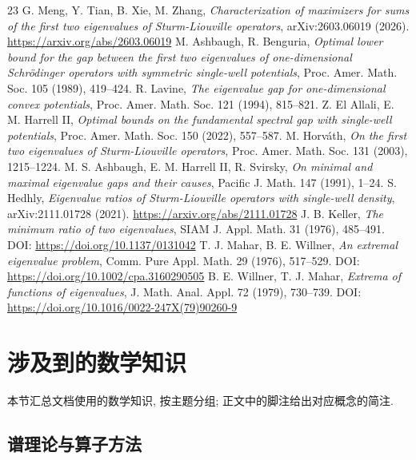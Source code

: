 \documentclass[UTF8]{ctexart}
\begin{document}
\begin{thebibliography}{23}
 G. Meng, Y. Tian, B. Xie, M. Zhang, \emph{Characterization of
	maximizers for sums of the first two eigenvalues of Sturm-Liouville operators},
	arXiv:2603.06019 (2026). \url{https://arxiv.org/abs/2603.06019}
 M. Ashbaugh, R. Benguria, \emph{Optimal lower bound for the gap
	between the first two eigenvalues of one-dimensional Schr\"odinger operators
	with symmetric single-well potentials}, Proc. Amer. Math. Soc. 105 (1989),
	419--424.
 R. Lavine, \emph{The eigenvalue gap for one-dimensional convex
	potentials}, Proc. Amer. Math. Soc. 121 (1994), 815--821.
 Z. El Allali, E. M. Harrell II, \emph{Optimal bounds on the
	fundamental spectral gap with single-well potentials}, Proc. Amer. Math. Soc.
	150 (2022), 557--587.
 M. Horv\'ath, \emph{On the first two eigenvalues of
	Sturm-Liouville operators}, Proc. Amer. Math. Soc. 131 (2003), 1215--1224.
 M. S. Ashbaugh, E. M. Harrell II, R. Svirsky, \emph{On minimal and
	maximal eigenvalue gaps and their causes}, Pacific J. Math. 147 (1991), 1--24.
 S. Hedhly, \emph{Eigenvalue ratios of Sturm-Liouville
	operators with single-well density}, arXiv:2111.01728 (2021).
	\url{https://arxiv.org/abs/2111.01728}
 J. B. Keller, \emph{The minimum ratio of two eigenvalues},
	SIAM J. Appl. Math. 31 (1976), 485--491.
	DOI: \url{https://doi.org/10.1137/0131042}
 T. J. Mahar, B. E. Willner, \emph{An extremal eigenvalue problem},
	Comm. Pure Appl. Math. 29 (1976), 517--529.
	DOI: \url{https://doi.org/10.1002/cpa.3160290505}
 B. E. Willner, T. J. Mahar, \emph{Extrema of functions of eigenvalues},
	J. Math. Anal. Appl. 72 (1979), 730--739.
	DOI: \url{https://doi.org/10.1016/0022-247X(79)90260-9}
\end{thebibliography}

\section{涉及到的数学知识}

本节汇总文档使用的数学知识, 按主题分组; 正文中的脚注给出对应概念的简注.

\subsection{谱理论与算子方法}
\end{document}
